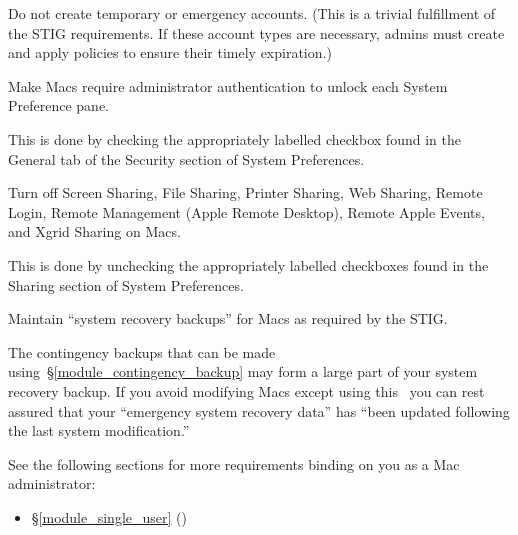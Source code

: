 %
Do not create temporary or emergency accounts. (This is a trivial
fulfillment of the STIG requirements. If these account types are
necessary, admins must create and apply policies to ensure their
timely expiration.)


%
Make Macs require administrator authentication to unlock each System
Preference pane.

This is done by checking the appropriately labelled checkbox found in the
General tab of the Security section of System Preferences.

%
%
%
Turn off Screen Sharing, File Sharing, Printer Sharing, Web Sharing,
Remote Login, Remote Management (Apple Remote Desktop), Remote Apple
Events, and Xgrid Sharing on Macs.

This is done by unchecking the appropriately labelled checkboxes found in
the Sharing section of System Preferences.

%
Maintain ``system recovery backups'' for Macs as required by the STIG.

The contingency backups that can be made
using~\S\ref{module_contingency_backup} may form a large part of your
system recovery backup. If you avoid modifying Macs except using this
\CMITSPolicy\, you can rest assured that your ``emergency system recovery
data'' has ``been updated following the last system modification.''

See the following sections for more requirements binding on you as a
Mac administrator:
\begin{itemize}
\item \S\ref{module_single_user} ()
\end{itemize}
